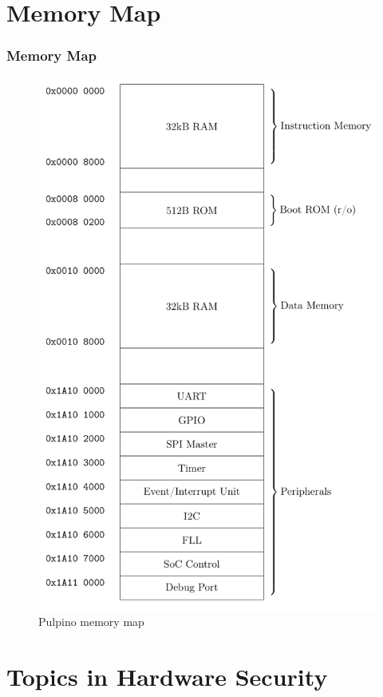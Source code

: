 \documentclass[xcolor={usenames,dvipsnames},hyperref={hyperindex,bookmarks}]{beamer}
\begin{document}


\section{Memory Map}

\frame
{
	\frametitle{Memory Map}


\begin{figure}[h]
\centering 
\includegraphics[height=2.2 in]{./pics/Pulpino_Memory_Map}
\caption{Pulpino memory map}
\label{fig:PulpinoMemoryMap}
\end{figure}
}





\section{Topics in Hardware Security}
\end{document}
